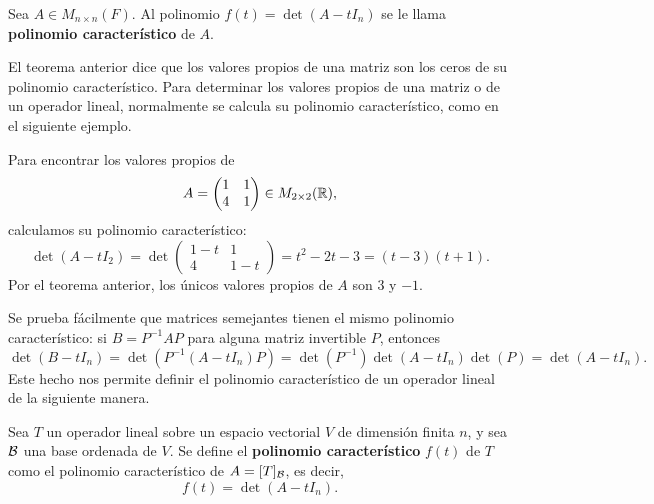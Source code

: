 \documentclass[12pt,a4paper]{book}
\begin{document}
    \begin{definicion}
        Sea $A \in M_{n \times n}(F)$. Al polinomio $f(t) = \det(A - tI_n)$ se le llama \textbf{polinomio característico} de $A$.
    \end{definicion}

    El teorema anterior dice que los valores propios de una matriz son los ceros de su polinomio característico. Para determinar los valores propios de una matriz o de un operador lineal, normalmente se calcula su polinomio característico, como en el siguiente ejemplo.

    \begin{ejemplo}
        Para encontrar los valores propios de
        \begin{equation*}
            A = \begin{pmatrix} 1 & 1 \\ 4 & 1 \end{pmatrix} \in M_{2\times 2}(\mathbb{R}),
        \end{equation*}
        calculamos su polinomio característico:
        \begin{equation*}
            \det(A - tI_2) = \det\begin{pmatrix} 1 - t & 1 \\ 4 & 1 - t \end{pmatrix} = t^2 - 2t - 3 = (t-3)(t+1).
        \end{equation*}
        Por el teorema anterior, los únicos valores propios de $A$ son $3$ y $-1$.
    \end{ejemplo}

    Se prueba fácilmente que matrices semejantes tienen el mismo polinomio característico: si $B = P^{-1}AP$ para alguna matriz invertible $P$, entonces
    \begin{equation*}
        \det(B - tI_n) = \det\left(P^{-1}(A-tI_n)P\right) = \det(P^{-1})\det(A-tI_n)\det(P) = \det(A - tI_n).
    \end{equation*}
    Este hecho nos permite definir el polinomio característico de un operador lineal de la siguiente manera.

    \begin{definicion}
        Sea $T$ un operador lineal sobre un espacio vectorial $V$ de dimensión finita $n$, y sea $\mathcal{B}$ una base ordenada de $V$. Se define el \textbf{polinomio característico} $f(t)$ de $T$ como el polinomio característico de $A = [T]_{\mathcal{B}}$, es decir,
        \begin{equation*}
            f(t) = \det(A - tI_n).
        \end{equation*}
    \end{definicion}
\end{document}
